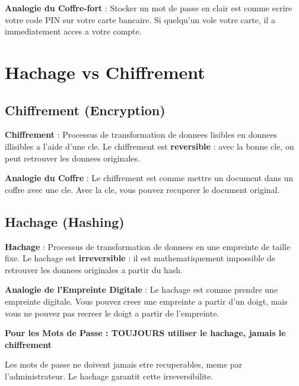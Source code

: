 \documentclass[a4paper,12pt]{book}
\begin{document}
\begin{analogybox}
    \textbf{Analogie du Coffre-fort} : Stocker un mot de passe en clair est comme ecrire votre code PIN sur votre carte bancaire. Si quelqu'un vole votre carte, il a immediatement acces a votre compte.
\end{analogybox}

\section{Hachage vs Chiffrement}

\subsection{Chiffrement (Encryption)}

\begin{definitionbox}
    \textbf{Chiffrement} : Processus de transformation de donnees lisibles en donnees illisibles a l'aide d'une cle. Le chiffrement est \textbf{reversible} : avec la bonne cle, on peut retrouver les donnees originales.
\end{definitionbox}

\begin{analogybox}
    \textbf{Analogie du Coffre} : Le chiffrement est comme mettre un document dans un coffre avec une cle. Avec la cle, vous pouvez recuperer le document original.
\end{analogybox}

\subsection{Hachage (Hashing)}

\begin{definitionbox}
    \textbf{Hachage} : Processus de transformation de donnees en une empreinte de taille fixe. Le hachage est \textbf{irreversible} : il est mathematiquement impossible de retrouver les donnees originales a partir du hash.
\end{definitionbox}

\begin{analogybox}
    \textbf{Analogie de l'Empreinte Digitale} : Le hachage est comme prendre une empreinte digitale. Vous pouvez creer une empreinte a partir d'un doigt, mais vous ne pouvez pas recreer le doigt a partir de l'empreinte.
\end{analogybox}

\begin{bestpracticebox}
    \textbf{Pour les Mots de Passe : TOUJOURS utiliser le hachage, jamais le chiffrement}

    Les mots de passe ne doivent jamais etre recuperables, meme par l'administrateur. Le hachage garantit cette irreversibilite.
\end{bestpracticebox}
\end{document}
